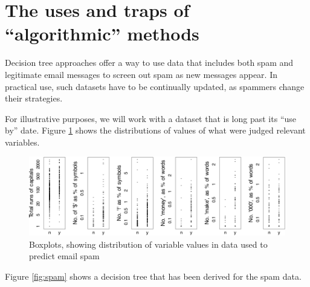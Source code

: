 \documentclass[
  10pt,
  b5paper]{book}
\begin{document}
\hypertarget{the-uses-and-traps-of-algorithmic-methods}{%
\section{The uses and traps of ``algorithmic'' methods}\label{the-uses-and-traps-of-algorithmic-methods}}

Decision tree approaches offer a way to use data that includes
both spam and legitimate email messages to screen out spam as
new messages appear. In practical use, such datasets have to
be continually updated, as spammers change their strategies.

For illustrative purposes, we will work
with a dataset that is long past its ``use by'' date.
Figure \ref{fig:seeSpam} shows the distributions of values of
what were judged relevant variables.

\begin{figure}[H]

{\centering \includegraphics{08-observational_files/figure-latex/seeSpam-1} 

}

\caption{Boxplots, showing distribution of variable values
               in data used to predict email spam}\label{fig:seeSpam}
\end{figure}

Figure \ref{fig:spam} shows a decision tree that has been derived
for the spam data.
\end{document}
